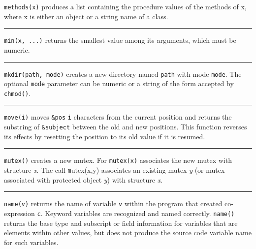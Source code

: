 \noindent
\texttt{methods(x)} produces a list containing the procedure values of
the methods of x, where x is either an object or a string name of a
class.

\bigskip\hrule\vspace{0.1cm}

\noindent
{}\texttt{min(x, ...)} returns the smallest value among its
arguments, which must be numeric.

\bigskip\hrule\vspace{0.1cm}

\noindent
{}\texttt{mkdir(path,
mode)} creates a new directory named \texttt{path} with mode
\texttt{mode}. The optional \texttt{mode} parameter can be numeric or a
string of the form accepted by \texttt{chmod()}.

\bigskip\hrule\vspace{0.1cm}

\noindent
{}\texttt{move(i)} moves \texttt{\&pos} \texttt{i}
characters from the current position and returns the substring of
\texttt{\&subject} between the old and new positions. This function
reverses its effects by resetting the position to its old value if it
is resumed.

\bigskip\hrule\vspace{0.1cm}

\noindent
{}\texttt{mutex()} creates a new mutex. For \texttt{mutex(x)}
associates the new mutex with structure {\textit x}.
The call {\texttt mutex(x,y)} associates an existing mutex \textit{y} (or
mutex associated with protected object \textit{y}) with
structure {\textit x}.

\bigskip\hrule\vspace{0.1cm}

\noindent
{}\texttt{name(v)} returns the name of variable \texttt{v}
within the program that created co-expression \texttt{c}. Keyword
variables are recognized and named correctly. \texttt{name()} returns
the base type and subscript or field information for variables that are
elements within other values, but does not produce the source code
variable name for such variables. 

